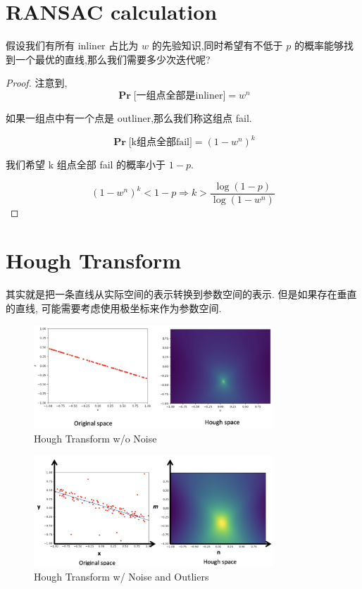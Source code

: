 \section{RANSAC calculation}
\begin{problem}
假设我们有所有 inliner 占比为 $w$ 的先验知识,同时希望有不低于 $p$ 的概率能够找到一个最优的直线,那么我们需要多少次迭代呢?
\end{problem}
\begin{proof}
注意到, 
\begin{equation}
\mathbf{\Pr}\text{[一组点全部是inliner]} = w^n
\end{equation}

如果一组点中有一个点是 outliner,那么我们称这组点 fail.

\begin{equation}
\mathbf{\Pr}\text{[k组点全部fail]} = {(1-w^n)}^k
\end{equation}

我们希望 k 组点全部 fail 的概率小于 $1-p$.

\begin{equation}
{(1-w^{n})}^k < 1-p
\Rightarrow
k > \frac{\log(1-p)}{\log(1-w^n)}
\end{equation}
\end{proof}

\section{Hough Transform}

其实就是把一条直线从实际空间的表示转换到参数空间的表示. 但是如果存在垂直的直线, 可能需要考虑使用极坐标来作为参数空间.

\begin{figure}[htbp]
    \centering
    \includegraphics[width=0.8\textwidth]{figures/hough1.png}
    \caption{Hough Transform w/o Noise}
\end{figure}

\begin{figure}[htbp]
    \centering
    \includegraphics[width=0.8\textwidth]{figures/hough2.png}
    \caption{Hough Transform w/ Noise and Outliers}
\end{figure}